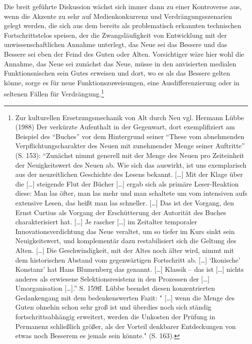 \documentclass[a4paper,
fontsize=11pt,
oneside,
numbers=noperiodatend,
parskip=half-,
bibliography=totoc,
final
]{scrartcl}
\begin{document}
Die breit geführte Diskussion wächst sich immer dann zu einer
Kontroverse aus, wenn die Akzente zu sehr auf Medienkonkurrenz und
Verdrängungsszenarien gelegt werden, die sich aus dem bereits als
problematisch erkannten technischen Fortschrittstelos speisen, der die
Zwangsläufigkeit von Entwicklung mit der unwissenschaftlichen Annahme
unterlegt, das Neue sei das Bessere und das Bessere sei eben der Feind
des Guten oder Alten. Vorsichtiger wäre hier wohl die Annahme, das Neue
sei zunächst das Neue, müsse in den anvisierten medialen
Funktionsnischen sein Gutes erweisen und dort, wo es als das Bessere
gelten könne, sorge es für neue Funktionszuweisungen, eine
Ausdifferenzierung oder in seltenen Fällen für Verdrängung.\footnote{Zur
  kulturellen Ersetzungsmechanik von Alt durch Neu vgl. Hermann Lübbe
  (1988) Der verkürzte Aufenthalt in der Gegenwart, dort exemplifiziert
  am Beispiel des \enquote{Buches} vor dem Hintergrund seiner
  \enquote{These vom abnehmenden Verpflichtungscharakter des Neuen mit
  zunehmender Menge seiner Auftritte} (S. 153): \enquote{Zunächst nimmt
  generell mit der Menge des Neuen pro Zeiteinheit der Neuigkeitswert
  des Neuen ab. Wie sich das auswirkt, ist uns exemplarisch aus der
  neuzeitlichen Geschichte des Lesens bekannt. {[}\ldots{}{]} Mit der
  Klage über die {[}\ldots{}{]} steigende Flut der Bücher {[}\ldots{}{]}
  ergab sich als primäre Leser-Reaktion diese: Man las öfter, man las
  mehr und man schaltete um vom intensiven aufs extensive Lesen, das
  heißt man las schneller. {[}\ldots{}{]} Das ist der Vorgang, den Ernst
  Curtius als Vorgang der Erschütterung der Autorität des Buches
  charakterisiert hat. {[}\ldots{}{]} Je rascher {[}\ldots{}{]} im
  Zeitalter temporaler Innovationsverdichtung das Neue veraltet, um so
  tiefer im Kurs sinkt sein Neuigkeitswert, und komplementär dazu
  restabilisiert sich die Geltung des Alten. {[}\ldots{}{]} Die
  Geschwindigkeit, mit der Altes noch älter wird, nimmt mit dem
  historischen Abstand vom gegenwärtigen Fortschritt ab. {[}\ldots{}{]}
  \enquote{Ikonische} Konstanz' hat Hans Blumenberg das genannt.
  {[}\ldots{}{]} Klassik -- das ist {[}\ldots{}{]} nichts anderes als
  erwiesene Selektionsresistenz in den Prozessen der {[}\ldots{}{]}
  Umorganisation {[}\ldots{}{]}.} S. 159ff. Lübbe beendet diesen
  konzentrierten Gedankengang mit dem bedenkenswerten Fazit: "
  {[}\ldots{}{]} wenn die Menge des Guten ohnehin schon sehr groß ist
  und überdies noch sich ständig fortschrittsabhängig erweitert, werden
  die Unkosten der Prüfung in Permanenz schließlich größer, als der
  Vorteil denkbarer Entdeckungen von etwas noch Besserem es jemals sein
  könnte." (S. 163).}
\end{document}
